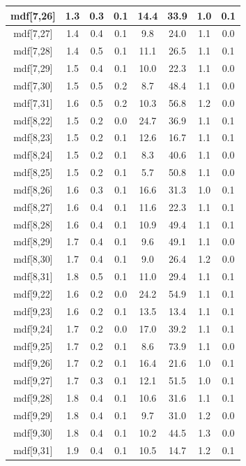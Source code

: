 \begin{longtable}{|c|c|c|c|c|c|c|c|}
\hline
mdf[7,26] & 1.3 & 0.3 & 0.1 & 14.4 & 33.9 & 1.0 & 0.1 \\
\hline
mdf[7,27] & 1.4 & 0.4 & 0.1 & 9.8 & 24.0 & 1.1 & 0.0 \\
\hline
mdf[7,28] & 1.4 & 0.5 & 0.1 & 11.1 & 26.5 & 1.1 & 0.1 \\
\hline
mdf[7,29] & 1.5 & 0.4 & 0.1 & 10.0 & 22.3 & 1.1 & 0.0 \\
\hline
mdf[7,30] & 1.5 & 0.5 & 0.2 & 8.7 & 48.4 & 1.1 & 0.0 \\
\hline
mdf[7,31] & 1.6 & 0.5 & 0.2 & 10.3 & 56.8 & 1.2 & 0.0 \\
\hline
mdf[8,22] & 1.5 & 0.2 & 0.0 & 24.7 & 36.9 & 1.1 & 0.1 \\
\hline
mdf[8,23] & 1.5 & 0.2 & 0.1 & 12.6 & 16.7 & 1.1 & 0.1 \\
\hline
mdf[8,24] & 1.5 & 0.2 & 0.1 & 8.3 & 40.6 & 1.1 & 0.0 \\
\hline
mdf[8,25] & 1.5 & 0.2 & 0.1 & 5.7 & 50.8 & 1.1 & 0.0 \\
\hline
mdf[8,26] & 1.6 & 0.3 & 0.1 & 16.6 & 31.3 & 1.0 & 0.1 \\
\hline
mdf[8,27] & 1.6 & 0.4 & 0.1 & 11.6 & 22.3 & 1.1 & 0.1 \\
\hline
mdf[8,28] & 1.6 & 0.4 & 0.1 & 10.9 & 49.4 & 1.1 & 0.1 \\
\hline
mdf[8,29] & 1.7 & 0.4 & 0.1 & 9.6 & 49.1 & 1.1 & 0.0 \\
\hline
mdf[8,30] & 1.7 & 0.4 & 0.1 & 9.0 & 26.4 & 1.2 & 0.0 \\
\hline
mdf[8,31] & 1.8 & 0.5 & 0.1 & 11.0 & 29.4 & 1.1 & 0.1 \\
\hline
mdf[9,22] & 1.6 & 0.2 & 0.0 & 24.2 & 54.9 & 1.1 & 0.1 \\
\hline
mdf[9,23] & 1.6 & 0.2 & 0.1 & 13.5 & 13.4 & 1.1 & 0.1 \\
\hline
mdf[9,24] & 1.7 & 0.2 & 0.0 & 17.0 & 39.2 & 1.1 & 0.1 \\
\hline
mdf[9,25] & 1.7 & 0.2 & 0.1 & 8.6 & 73.9 & 1.1 & 0.0 \\
\hline
mdf[9,26] & 1.7 & 0.2 & 0.1 & 16.4 & 21.6 & 1.0 & 0.1 \\
\hline
mdf[9,27] & 1.7 & 0.3 & 0.1 & 12.1 & 51.5 & 1.0 & 0.1 \\
\hline
mdf[9,28] & 1.8 & 0.4 & 0.1 & 10.6 & 31.6 & 1.1 & 0.1 \\
\hline
mdf[9,29] & 1.8 & 0.4 & 0.1 & 9.7 & 31.0 & 1.2 & 0.0 \\
\hline
mdf[9,30] & 1.8 & 0.4 & 0.1 & 10.2 & 44.5 & 1.3 & 0.0 \\
\hline
mdf[9,31] & 1.9 & 0.4 & 0.1 & 10.5 & 14.7 & 1.2 & 0.1 \\

\end{longtable}
